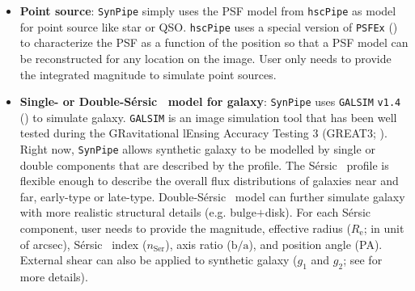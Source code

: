 \documentclass[useamsfonts]{pasj01}
\def\ser{{S\'{e}rsic\ }}
\def\hscpipe{\texttt{hscPipe}}
\def\synpipe{\texttt{SynPipe}}
\def\galsim{\texttt{G}{\scriptsize \texttt{AL}}\texttt{S}{\scriptsize \texttt{IM}}}
\begin{document}
    \begin{itemize}

        \item \textbf{Point source}:
            \synpipe{} simply uses the PSF model from \hscpipe{} as model for
            point source like star or QSO.
            \hscpipe{} uses a special version of \texttt{PSFEx}
            (\citealt{Bertin2011, Bertin2013}) to characterize the PSF as a function
            of the position so that a PSF model can be reconstructed for any location
            on the image.
            User only needs to provide the integrated magnitude to simulate
            point sources.

        \item \textbf{Single- or Double-\ser{} model for galaxy}:
            \texttt{SynPipe} uses \galsim{} \texttt{v1.4} (\citealt{Rowe2015}) to
            simulate galaxy.
            \galsim{} is an image simulation tool that has been well tested during
            the GRavitational lEnsing Accuracy Testing 3 (GREAT3;
            \citealt{Mandelbaum2014}).
            Right now, \synpipe{} allows synthetic galaxy to be modelled by single
            or double components that are described by the \citet{Sersic1963}
            profile.
            The \ser{} profile is flexible enough to describe the overall flux
            distributions of galaxies near and far, early-type or late-type.
            Double-\ser{} model can further simulate galaxy with more realistic
            structural details (e.g. bulge$+$disk).
            For each \ser{} component, user needs to provide the magnitude,
            effective radius ($R_{\mathrm{e}}$; in unit of arcsec), \ser{} index
            ($n_{\mathrm{Ser}}$), axis ratio ($\mathrm{b}/\mathrm{a}$), and position
            angle (PA).
            External shear can also be applied to synthetic galaxy ($g_1$ and $g_2$;
            see \citealt{Rowe2015} for more details).


\end{itemize}
\end{document}
